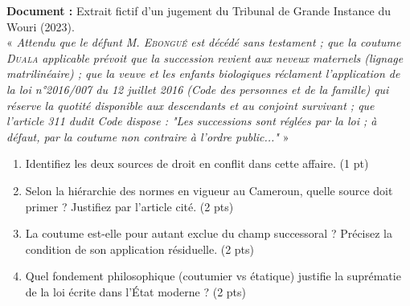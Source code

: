 \documentclass[11pt]{article}
\begin{document}
\begin{exercice}
\textbf{Document :} Extrait fictif d'un jugement du Tribunal de Grande Instance du Wouri (2023). \\
« \textit{Attendu que le défunt M. \textsc{Ebongué} est décédé sans testament ; que la coutume \textsc{Duala} applicable prévoit que la succession revient aux neveux maternels (lignage matrilinéaire) ; que la veuve et les enfants biologiques réclament l'application de la loi n°2016/007 du 12 juillet 2016 (Code des personnes et de la famille) qui réserve la quotité disponible aux descendants et au conjoint survivant ; que l'article 311 dudit Code dispose : "Les successions sont réglées par la loi ; à défaut, par la coutume non contraire à l'ordre public..." } »
\begin{enumerate}
    \item Identifiez les deux sources de droit en conflit dans cette affaire. (1 pt)
    \item Selon la hiérarchie des normes en vigueur au Cameroun, quelle source doit primer ? Justifiez par l'article cité. (2 pts)
    \item La coutume est-elle pour autant exclue du champ successoral ? Précisez la condition de son application résiduelle. (2 pts)
    \item Quel fondement philosophique (coutumier vs étatique) justifie la suprématie de la loi écrite dans l'État moderne ? (2 pts)
\end{enumerate}
\end{exercice}
\end{document}
